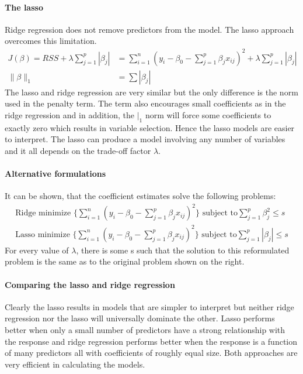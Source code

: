 \documentclass[../document.tex]{subfiles}
\begin{document}
	\paragraph{The lasso}
	Ridge regression does not remove predictors from the model. The lasso approach overcomes this limitation.
	\begin{equation}
	\begin{split}
		J(\beta) = RSS+\lambda\sum_{j=1}^{p}|\beta_{j}| &= \sum_{i=1}^{n}(y_{i}-\beta_{0}-\sum_{j=1}^{p}\beta_{j}x_{ij})^2+\lambda\sum_{j=1}^{p}|\beta_{j}|\\
		\|\beta\|_{1}&=\sum|\beta_{j}|
	\end{split}
	\end{equation}
	The lasso and ridge regression are very similar but the only difference is the norm used in the penalty term. The term also encourages small coefficients as in the ridge regression and in addition, the \(|_{1}\) norm will force some coefficients to exactly zero which results in variable selection. Hence the lasso models are easier to interpret. The lasso can produce a model involving any number of variables and it all depends on the trade-off factor \(\lambda\).

	\paragraph{Alternative formulations}
	It can be shown, that the coefficient estimates solve the following problems:
	\begin{equation}
	\begin{split}
		\text{Ridge minimize }\{\sum_{i=1}^{n}(y_{i}-\beta_{0}-\sum_{j=1}^{p}\beta_{j}x_{ij})^2\}\text{ subject to}\sum_{j=1}^{p}\beta_{j}^2\leq s\\
		\text{Lasso minimize }\{\sum_{i=1}^{n}(y_{i}-\beta_{0}-\sum_{j=1}^{p}\beta_{j}x_{ij})^2\}\text{ subject to}\sum_{j=1}^{p}|\beta_{j}|\leq s
	\end{split}
	\end{equation}
	For every value of \(\lambda\), there is some s such that the solution to this reformulated problem is the same as to the original problem shown on the right.

	\paragraph{Comparing the lasso and ridge regression}
	Clearly the lasso results in models that are simpler to interpret but neither ridge regression nor the lasso will universally dominate the other. Lasso performs better when only a small number of predictors have a strong relationship with the response and ridge regression performs better when the response is a function of many predictors all with coefficients of roughly equal size. Both approaches are very efficient in calculating the models.
\end{document}
